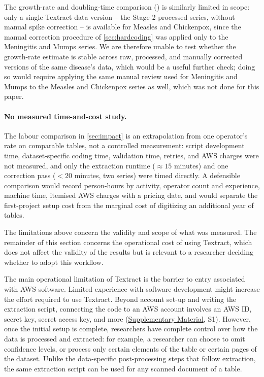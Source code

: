 \documentclass[12pt]{article}
\begin{document}
The growth-rate and doubling-time comparison () is similarly limited in scope: only a single Textract data version -- the Stage-2 processed series, without manual spike correction -- is available for Measles and Chickenpox, since the manual correction procedure of \cref{sec:hardcoding} was applied only to the Meningitis and Mumps series. We are therefore unable to test whether the growth-rate estimate is stable across raw, processed, and manually corrected versions of the same disease's data, which would be a useful further check; doing so would require applying the same manual review used for Meningitis and Mumps to the Measles and Chickenpox series as well, which was not done for this paper.

\paragraph{No measured time-and-cost study.} The labour comparison in \cref{sec:impact} is an extrapolation from one operator's rate on comparable tables, not a controlled measurement: script development time, dataset-specific coding time, validation time, retries, and AWS charges were not measured, and only the extraction runtime ($\approx15$ minutes) and one correction pass ($<20$ minutes, two series) were timed directly. A defensible comparison would record person-hours by activity, operator count and experience, machine time, itemised AWS charges with a pricing date, and would separate the first-project setup cost from the marginal cost of digitizing an additional year of tables.

\bigskip
\noindent The limitations above concern the validity and scope of what was measured. The remainder of this section concerns the operational cost of using Textract, which does not affect the validity of the results but is relevant to a researcher deciding whether to adopt this workflow.

The main operational limitation of Textract is the barrier to entry associated with AWS software. Limited experience with software development might increase the effort required to use Textract. Beyond account set-up and writing the extraction script, connecting the code to an AWS account involves an AWS ID, secret key, secret access key, and more (\hyperref[sec:supp]{Supplementary Material}, S1). However, once the initial setup is complete, researchers have complete control over how the data is processed and extracted: for example, a researcher can choose to omit confidence levels, or process only certain elements of the table or certain pages of the dataset. Unlike the data-specific post-processing steps that follow extraction, the same extraction script can be used for any scanned document of a table.
\end{document}
